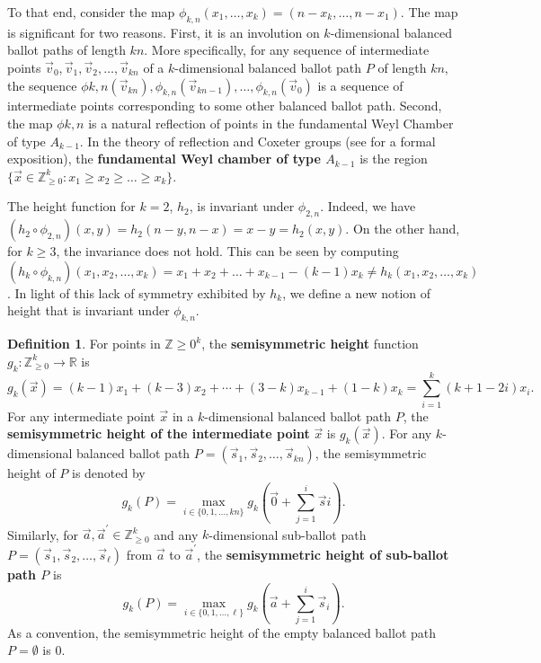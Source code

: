 \documentclass[11pt]{article}
\theoremstyle{remark}
\theoremstyle{definition}
\newtheorem{definition}[theorem]{Definition}
\begin{document}
To that end, consider the map $\phi_{k, n}(x_1,\ldots,x_k)= (n-x_k,\ldots,n-x_1)$. The map is significant for two reasons. First, it is an involution on $k$-dimensional balanced ballot paths of length $kn$. More specifically, for any sequence of intermediate points $\vec{v}_0, \vec{v}_1, \vec{v}_2, \dots, \vec{v}_{kn}$ of a $k$-dimensional balanced ballot path $P$ of length $kn$, the sequence $\phi{k, n}(\vec{v}_{kn}), \phi_{k, n}(\vec{v}_{kn-1}), \dots, \phi_{k, n}(\vec{v}_0)$ is a sequence of intermediate points corresponding to some other balanced ballot path. Second, the map $\phi{k, n}$ is a natural reflection of points in the fundamental Weyl Chamber of type $A_{k-1}$. In the theory of reflection and Coxeter groups (see \cite{MR1066460} for a formal exposition), the \textbf{fundamental Weyl chamber of type $A_{k-1}$} is the region $\{\vec{x} \in \mathbb{Z}_{\geq0 }^k: x_1 \geq x_2 \geq \dots \geq x_k\}$.

The height function for $k=2$, $h_2$, is invariant under $\phi_{2, n}$. Indeed, we have $(h_2 \circ \phi_{2, n})(x, y) = h_2(n-y, n-x)= x-y=h_2(x, y)$. On the other hand, for $k \geq 3$, the invariance does not hold. This can be seen by computing $(h_k \circ \phi_{k, n})(x_1, x_2, \dots, x_k)  = x_1+x_2+\dots+x_{k-1}-(k-1)x_{k} \neq h_k(x_1, x_2, \dots, x_k)$. In light of this lack of symmetry exhibited by $h_k$, we define a new notion of height that is invariant under $\phi_{k, n}$.
\begin{definition}
\label{def:height-new}
For points in $\mathbb{Z}{\geq 0}^k$, the \textbf{semisymmetric height} function $g_k: \mathbb{Z}_{\geq 0}^k \to \mathbb{R}$ is $$g_k(\vec{x}) = (k-1)x_1 + (k-3)x_2 + \cdots + (3-k)x_{k-1} + (1-k)x_k = \sum_{i=1}^k (k+1-2i)x_i.$$ For any intermediate point $\vec{x}$ in a $k$-dimensional balanced ballot path $P$, the \textbf{semisymmetric height of the intermediate point} $\vec{x}$ is $g_k(\vec{x})$.  For any $k$-dimensional balanced ballot path $P = (\vec{s}_1, \vec{s}_2, \dots, \vec{s}_{kn})$, the semisymmetric height of $P$ is denoted by $$g_k(P) = \max_{i \in \{0,1, \dots, kn\}}{g_k(\vec{0}+\sum_{j=1}^i\vec{s}i)}.$$ Similarly, for $\vec{a}, \vec{a}^{\prime} \in \mathbb{Z}_{\geq 0}^k $ and any $k$-dimensional sub-ballot path $P = (\vec{s}_1, \vec{s}_2, \dots, \vec{s}_{\ell})$ from $\vec{a}$ to $\vec{a}^{\prime}$, the \textbf{semisymmetric height of sub-ballot path $P$} is $$g_k(P) = \max_{i \in \{0,1, \dots, \ell\}}{g_k(\vec{a}+\sum_{j=1}^i\vec{s}_i)}.$$ As a convention, the semisymmetric height of the empty balanced ballot path $P = \emptyset$ is $0$.
\end{definition}
\end{document}
